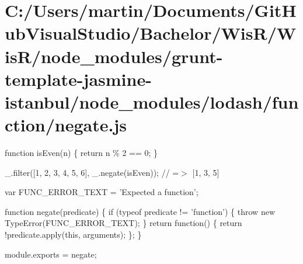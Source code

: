 \hypertarget{_c_1_2_users_2martin_2_documents_2_git_hub_visual_studio_2_bachelor_2_wis_r_2_wis_r_2node_module21b4d96ed5a14c16f48c27b4539e4eef}{}\section{C\+:/\+Users/martin/\+Documents/\+Git\+Hub\+Visual\+Studio/\+Bachelor/\+Wis\+R/\+Wis\+R/node\+\_\+modules/grunt-\/template-\/jasmine-\/istanbul/node\+\_\+modules/lodash/function/negate.\+js}
function is\+Even(n) \{ return n \% 2 == 0; \}

\+\_\+.\+filter(\mbox{[}1, 2, 3, 4, 5, 6\mbox{]}, \+\_\+.\+negate(is\+Even)); // =$>$ \mbox{[}1, 3, 5\mbox{]}


\begin{DoxyCodeInclude}

var FUNC\_ERROR\_TEXT = \textcolor{stringliteral}{'Expected a function'};

\textcolor{keyword}{function} negate(predicate) \{
  \textcolor{keywordflow}{if} (typeof predicate != \textcolor{stringliteral}{'function'}) \{
    \textcolor{keywordflow}{throw} \textcolor{keyword}{new} TypeError(FUNC\_ERROR\_TEXT);
  \}
  \textcolor{keywordflow}{return} \textcolor{keyword}{function}() \{
    \textcolor{keywordflow}{return} !predicate.apply(\textcolor{keyword}{this}, arguments);
  \};
\}

module.exports = negate;
\end{DoxyCodeInclude}
 